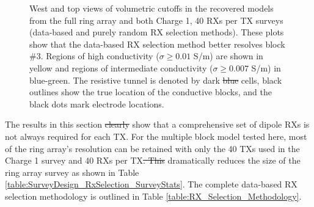 \documentclass[preprint,authoryear,12pt]{elsarticle}
\providecommand{\DIFaddtex}[1]{{\protect\color{blue}\uwave{#1}}} %
\providecommand{\DIFdeltex}[1]{{\protect\color{red}\sout{#1}}}                      %
\providecommand{\DIFaddbegin}{} %
\providecommand{\DIFaddend}{} %
\providecommand{\DIFdelbegin}{} %
\providecommand{\DIFdelend}{} %
\providecommand{\DIFaddFL}[1]{\DIFadd{#1}} %
\providecommand{\DIFdelFL}[1]{\DIFdel{#1}} %
\providecommand{\DIFaddbeginFL}{} %
\providecommand{\DIFaddendFL}{} %
\providecommand{\DIFdelbeginFL}{} %
\providecommand{\DIFdelendFL}{} %
\providecommand{\DIFadd}[1]{\texorpdfstring{\DIFaddtex{#1}}{#1}} %
\providecommand{\DIFdel}[1]{\texorpdfstring{\DIFdeltex{#1}}{}} %
\begin{document}
\begin{figure}[htp]{}
\begin{center}
   \end{center}
\vspace{-0.4cm}
\caption{West and top views of volumetric cutoffs in the recovered models from the full ring array and both Charge 1, 40 RXs per TX surveys (data-based and purely random RX selection methods). These plots show that the data-based RX selection method better resolves block \#3. Regions of high conductivity ($\sigma \geq 0.01$ S/m) are shown in yellow and regions of intermediate conductivity ($\sigma \geq 0.007$ S/m) in blue-green. The resistive tunnel is denoted by dark \DIFdelbeginFL \DIFdelFL{blue }\DIFdelendFL \DIFaddbeginFL \DIFaddFL{purple }\DIFaddendFL cells, black outlines show the true location of the conductive blocks, and the black dots mark electrode locations.}
\label{fig:InvMod_SurveyDesign_MultiBlk_Isosurfaces_RxSelection_DataVsRandom}
\end{figure}


The results in this section \DIFdelbegin \DIFdel{clearly }\DIFdelend show that a comprehensive set of dipole RXs is not always required for each TX. For the multiple block model tested here, most of the ring array's resolution can be retained with only the 40 TXs used in the Charge 1 survey and 40 RXs per TX\DIFdelbegin \DIFdel{. This }\DIFdelend \DIFaddbegin \DIFadd{, which }\DIFaddend dramatically reduces the size of the ring array survey as shown in Table \ref{table:SurveyDesign_RxSelection_SurveyStats}. The complete data-based RX selection methodology is outlined in Table \ref{table:RX_Selection_Methodology}.
\end{document}

